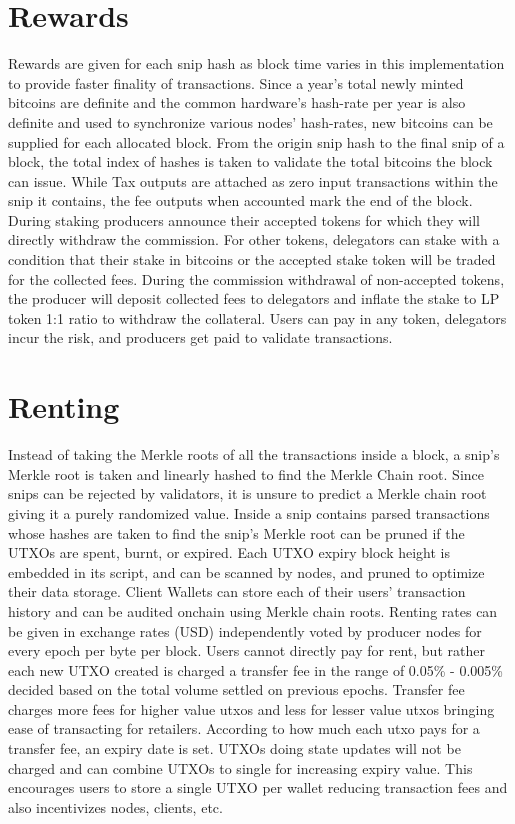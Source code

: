 \documentclass[a4paper,10pt]{article}
\begin{document}
\section{Rewards}
Rewards are given for each snip hash as block time varies in this implementation to provide faster finality of transactions. Since a year's total newly minted bitcoins are definite and the common hardware's hash-rate per year is also definite and used to synchronize various nodes' hash-rates, new bitcoins can be supplied for each allocated block. From the origin snip hash to the final snip of a block, the total index of hashes is taken to validate the total bitcoins the block can issue. While Tax outputs are attached as zero input transactions within the snip it contains, the fee outputs when accounted mark the end of the block. During staking producers announce their accepted tokens for which they will directly withdraw the commission. For other tokens, delegators can stake with a condition that their stake in bitcoins or the accepted stake token will be traded for the collected fees. During the commission withdrawal of non-accepted tokens, the producer will deposit collected fees to delegators and inflate the stake to LP token 1:1 ratio to withdraw the collateral. Users can pay in any token, delegators incur the risk, and producers get paid to validate transactions.
\section{Renting}
Instead of taking the Merkle roots of all the transactions inside a block, a snip's Merkle root is taken and linearly hashed to find the Merkle Chain root. Since snips can be rejected by validators, it is unsure to predict a Merkle chain root giving it a purely randomized value. Inside a snip contains parsed transactions whose hashes are taken to find the snip's Merkle root can be pruned if the UTXOs are spent, burnt, or expired. Each UTXO expiry block height is embedded in its script, and can be scanned by nodes, and pruned to optimize their data storage. Client Wallets can store each of their users' transaction history and can be audited onchain using Merkle chain roots. Renting rates can be given in exchange rates (USD) independently voted by producer nodes for every epoch per byte per block. Users cannot directly pay for rent, but rather each new UTXO created is charged a transfer fee in the range of 0.05\% - 0.005\% decided based on the total volume settled on previous epochs. Transfer fee charges more fees for higher value utxos and less for lesser value utxos bringing ease of transacting for retailers. According to how much each utxo pays for a transfer fee, an expiry date is set. UTXOs doing state updates will not be charged and can combine UTXOs to single for increasing expiry value. This encourages users to store a single UTXO per wallet reducing transaction fees and also incentivizes nodes, clients, etc.  
\end{document}
